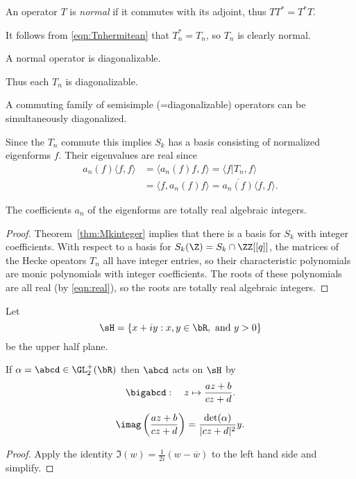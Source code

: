 \documentclass{report}
\begin{document}
\begin{defn}
An operator $T$ is {\em normal} if it commutes with its adjoint, thus
$TT^{*}=T^{*}T$.
\end{defn}
It follows from \eqref{eqn:Tnhermitean} that $T_n^{*}=T_n$,
so $T_n$ is clearly normal.
\begin{theorem}
A normal operator is diagonalizable.
\end{theorem}
Thus each $T_n$ is diagonalizable.
\begin{theorem}
A commuting family of semisimple (=diagonalizable) operators
can be simultaneously diagonalized.
\end{theorem}
Since the $T_n$ commute this implies $S_k$ has a basis consisting
of normalized eigenforms $f$. Their eigenvalues are real since
\begin{align}\label{eqn:real}
a_n(f)\langle f,f\rangle &=\langle a_n(f)f,f\rangle =\langle f|T_n,f\rangle\\
           &=\langle f,a_n(f)f\rangle =\overline{a_n(f)}\langle f,f\rangle.
\end{align}

\begin{proposition}\label{prop:totreal1}
  The coefficients $a_n$ of the eigenforms are totally real algebraic
  integers.
\end{proposition}
\begin{proof}
  Theorem~\ref{thm:Mkinteger} implies that there is a basis for $S_k$
  with integer coefficients.  With respect to a basis for $S_k(\Z) =
  S_k\cap \ZZ[[q]]$, the matrices of the Hecke opeators $T_n$ all have
  integer entries, so their characteristic polynomials are monic
  polynomials with integer coefficients.  The roots of these
  polynomials are all real (by \eqref{eqn:real}), so the roots are
  totally real algebraic integers.
\end{proof}

Let
$$\sH=\{x+iy : x, y\in \bR, \text{ and } y>0\}$$
be the upper half plane.

If $\alpha=\abcd\in\GL_2^{+}(\bR)$ then $\abcd$ acts on $\sH$ by
$$\bigabcd:\quad z\mapsto\frac{az+b}{cz+d}.$$
\begin{lemma}\label{lem:imaglft}
$$\imag\left(\frac{az+b}{cz+d}\right)=\frac{\det(\alpha)}{|cz+d|^2}y.$$
\end{lemma}
\begin{proof}
Apply the identity $\Im(w) = \frac{1}{2i}(w-\overline{w})$ to the
left hand side and simplify.
\end{proof}
\end{document}
